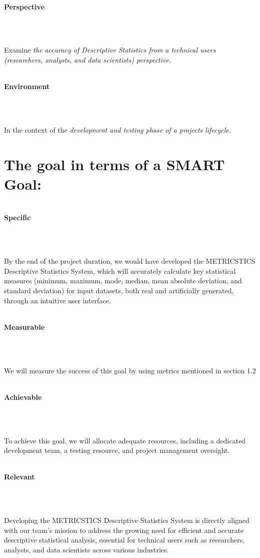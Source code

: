     \strut \\
    \textbf{\large Perspective}
    \strut \\
    \strut \\
    Examine \emph{the accuracy of Descriptive Statistics from a
    technical user\textquotesingle s (researchers, analysts, and data
    scientists) perspective.
    }
    
    \strut \\
    \textbf{\large Environment}
    \strut \\
    \strut \\
    In the context of the \emph{development and testing phase of a project\textquotesingle s lifecycle.
    }

    
    \pagebreak

    
    \section {The goal in terms of a SMART Goal:}
    
    \strut \\
    \textbf{\large Specific}
    \strut \\
    \strut \\
    By the end of the project duration, we would have developed the
    METRICSTICS Descriptive Statistics System, which will accurately
    calculate key statistical measures (minimum, maximum, mode, median,
    mean absolute deviation, and standard deviation) for input datasets,
    both real and artificially generated, through an intuitive user
    interface.
    
    \strut \\
    \textbf{\large Measurable}
    \strut \\
    \strut \\
    We will measure the success of this goal by using metrics mentioned in section 1.2
    
    \strut \\
    \textbf{\large Achievable}
    \strut \\
    \strut \\
    To achieve this goal, we will allocate adequate resources, including a dedicated development team, a testing resource, and project management oversight.
    
    \strut \\
    \textbf{\large Relevant}
    \strut \\
    \strut \\
    Developing the METRICSTICS Descriptive Statistics System is directly aligned with our team's mission to address the growing need for efficient and accurate descriptive statistical analysis, essential for technical users such as researchers, analysts, and data scientists across various industries.
    
